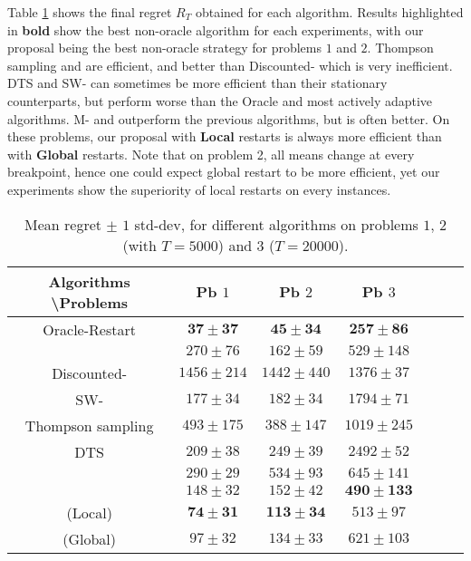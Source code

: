 

Table \ref{table:6:totalResults1} shows the final regret $R_T$ obtained for each algorithm.
Results highlighted in \textbf{bold} show the best non-oracle algorithm for each experiments,
with our proposal being the best non-oracle strategy for problems $1$ and $2$.
Thompson sampling and \klUCB{} are efficient,
and better than Discounted-\klUCB{} which is very inefficient.
DTS and SW-\klUCB{} can sometimes be more efficient than their stationary counterparts, but perform worse than the Oracle and most actively adaptive algorithms.
M-\klUCB{} and \CUSUMklUCB{} outperform the previous algorithms, but \GLRklUCB{} is often better.
%
On these problems, our proposal with \textbf{Local} restarts is always more efficient than with \textbf{Global} restarts. Note that on problem 2, all means change at every breakpoint, hence one could expect global restart to be more efficient, yet our experiments show the superiority of local restarts on every instances.

\begin{table}[ht]
    \centering
    \begin{tabular}{c|cccccc}
    \textbf{Algorithms} \textbackslash \textbf{Problems} & Pb $1$ & Pb $2$ & Pb $3$ \\
        \hline
        Oracle-Restart \klUCB{} & $\mathbf{37 \pm 37}$ & $\mathbf{45 \pm 34}$ & $\mathbf{257 \pm 86}$ \\
        \hline
        \klUCB{} & $270 \pm 76$ & $162 \pm 59$ & $529 \pm 148$ \\
        Discounted-\klUCB{} & $1456 \pm 214$ & $1442 \pm 440$ & $1376 \pm 37$ \\
        SW-\klUCB{} & $177 \pm 34$ & $182 \pm 34$ & $1794 \pm 71$ \\
        \hline
        Thompson sampling & $493 \pm 175$ & $388 \pm 147$ & $1019 \pm 245$ \\
        DTS & $209 \pm 38$ & $249 \pm 39$ & $2492 \pm 52$ \\
        \hline
        \MklUCB{} & $290 \pm 29$ & $534 \pm 93$ & $645 \pm 141$ \\
        \CUSUMklUCB{} & $148 \pm 32$ & $152 \pm 42$ & $\mathbf{490 \pm 133}$ \\
        \hline
        \GLRklUCB{}(Local) & $\mathbf{74 \pm 31}$ & $\mathbf{113 \pm 34}$ & $513 \pm 97$ \\
        \GLRklUCB{}(Global) & $97 \pm 32$ & $134 \pm 33$ & $621 \pm 103$
    \end{tabular}
    \caption{Mean regret $\pm$ $1$ std-dev, for different algorithms on problems $1$, $2$ (with $T=5000$) and $3$ ($T=20000$).
    }
    \label{table:6:totalResults1}
\end{table}

